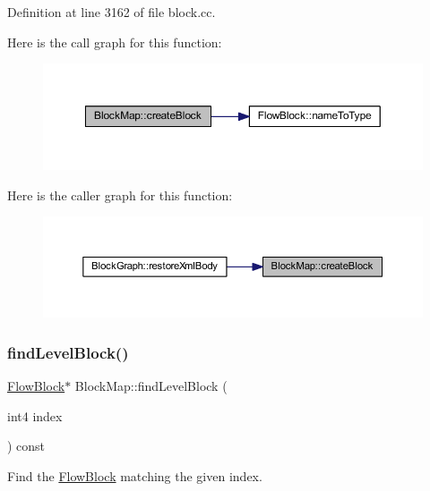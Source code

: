 Definition at line 3162 of file block.\+cc.

Here is the call graph for this function\+:
\nopagebreak
\begin{figure}[H]
\begin{center}
\leavevmode
\includegraphics[width=350pt]{class_block_map_a9fd04bc95c56621511ecbcbdbbcfbcaa_cgraph}
\end{center}
\end{figure}
Here is the caller graph for this function\+:
\nopagebreak
\begin{figure}[H]
\begin{center}
\leavevmode
\includegraphics[width=350pt]{class_block_map_a9fd04bc95c56621511ecbcbdbbcfbcaa_icgraph}
\end{center}
\end{figure}
\mbox{\label{class_block_map_abc5d592bf94c4e29c6a0efbcd1890883}} 
\subsubsection{\texorpdfstring{findLevelBlock()}{findLevelBlock()}}
{\footnotesize\ttfamily \mbox{\hyperlink{class_flow_block}{Flow\+Block}}$\ast$ Block\+Map\+::find\+Level\+Block (\begin{DoxyParamCaption}\item[{int4}]{index }\end{DoxyParamCaption}) const\hspace{0.3cm}{\ttfamily [inline]}}



Find the \mbox{\hyperlink{class_flow_block}{Flow\+Block}} matching the given index. 


